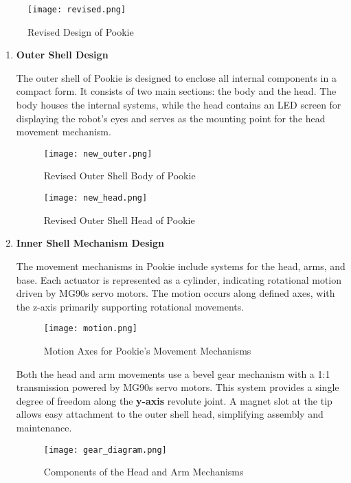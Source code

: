 \begin{figure}[ht]
    \centering
    \texttt{[image: revised.png]}
    \caption{Revised Design of Pookie}
    \label{fig:revised}
\end{figure}

\begin{enumerate}
    \item\textbf{Outer Shell Design}

    The outer shell of Pookie is designed to enclose all internal components in a compact form. It consists of two main sections: the body and the head. The body houses the internal systems, while the head contains an LED screen for displaying the robot's eyes and serves as the mounting point for the head movement mechanism.

\begin{figure}[ht]
    \centering
    \texttt{[image: new\_outer.png]}
    \caption{Revised Outer Shell Body of Pookie}
    \label{fig:revised_outer}
\end{figure}

\begin{figure}[ht]
    \centering
    \texttt{[image: new\_head.png]}
    \caption{Revised Outer Shell Head of Pookie}
    \label{fig:revised_head}
\end{figure}

\newpage
\item\textbf{Inner Shell Mechanism Design}

The movement mechanisms in Pookie include systems for the head, arms, and base. Each actuator is represented as a cylinder, indicating rotational motion driven by MG90s servo motors. The motion occurs along defined axes, with the z-axis primarily supporting rotational movements. 

\begin{figure}[!htb]
    \centering
    \texttt{[image: motion.png]}
    \caption{Motion Axes for Pookie's Movement Mechanisms}
    \label{fig:motion}
\end{figure}

Both the head and arm movements use a bevel gear mechanism with a 1:1 transmission powered by MG90s servo motors. This system provides a single degree of freedom along the \textbf{y-axis} revolute joint. A magnet slot at the tip allows easy attachment to the outer shell head, simplifying assembly and maintenance.

\begin{figure}[!htb]
    \centering
    \texttt{[image: gear\_diagram.png]}
    \caption{Components of the Head and Arm Mechanisms}
    \label{fig:components_head_arm}
\end{figure}


\end{enumerate}
